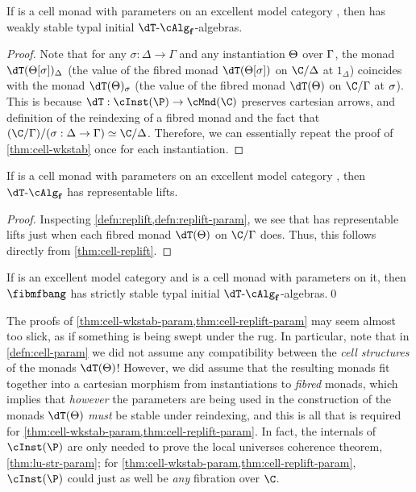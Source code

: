 \begin{enumerate}
\begin{enumerate}
\begin{thm}\label{thm:cell-wkstab-param}
  If \dT is a cell monad with parameters on an excellent model category \sM, then \fibmf has weakly stable typal initial $\dT\algf$-algebras.
\end{thm}
\begin{proof}
  Note that for any $\sigma:\Delta\to\Gamma$ and any instantiation $\Theta$ over $\Gamma$, the monad $\dT(\Th[\si])_\De$ (the value of the fibred monad $\dT(\Th[\si])$ on $\C/\Delta$ at $1_\Delta$) coincides with the monad $\dT(\Th)_{\si}$ (the value of the fibred monad $\dT(\Th)$ on $\C/\Gamma$ at $\sigma$).
  This is because $\dT: \cInst(\P) \to \cMnd(\C)$ preserves cartesian arrows, and definition of the reindexing of a fibred monad and the fact that $(\C/\Gm)/(\si:\De\to\Gm) \simeq \C/\De$.
  Therefore, we can essentially repeat the proof of \cref{thm:cell-wkstab} once for each instantiation.
\end{proof}

\begin{thm}\label{thm:cell-replift-param}
  If \dT is a cell monad with parameters on an excellent model category \sM, then $\dT\algf$ has representable lifts.
\end{thm}
\begin{proof}
  Inspecting \cref{defn:replift,defn:replift-param}, we see that \dT has representable lifts just when each fibred monad $\dT(\Th)$ on $\C/\Gamma$ does.
  Thus, this follows directly from \cref{thm:cell-replift}.
\end{proof}

\begin{cor}\label{thm:cellmndparam}
  If \sM is an excellent model category and \dT is a cell monad with parameters on it, then $\fibmfbang$ has strictly stable typal initial $\dT\algf$-algebras.\qed
\end{cor}

The proofs of \cref{thm:cell-wkstab-param,thm:cell-replift-param} may seem almost too slick, as if something is being swept under the rug.
In particular, note that in \cref{defn:cell-param} we did not assume any compatibility between the \emph{cell structures} of the monads $\dT(\Th)$!
However, we did assume that the resulting monads fit together into a cartesian morphism from instantiations to \emph{fibred} monads, which implies that \emph{however} the parameters are being used in the construction of the monads $\dT(\Th)$ \emph{must} be stable under reindexing, and this is all that is required for \cref{thm:cell-wkstab-param,thm:cell-replift-param}.
In fact, the internals of $\cInst(\P)$ are only needed to prove the local universes coherence theorem, \cref{thm:lu-str-param}; for \cref{thm:cell-wkstab-param,thm:cell-replift-param}, $\cInst(\P)$ could just as well be \emph{any} fibration over $\C$.


\end{enumerate}
\end{enumerate}

